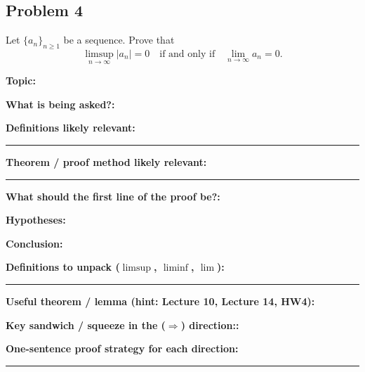 \documentclass[12pt]{article}
\newcommand{\fillfield}[1]{%
  \par\noindent\textbf{#1:}\enspace\hrulefill\par\vspace{3pt}%
}
\newcommand{\fillfieldlong}[1]{%
  \par\noindent\textbf{#1:}\par\vspace{1.5cm}%
  \noindent\rule{\linewidth}{0.35pt}\par\vspace{4pt}%
}
\begin{document}
\newpage
\subsection{Problem 4}

\begin{tcolorbox}[
  enhanced, breakable,
  colback  = probblue,
  colframe = blue!55!black,
  fonttitle = \bfseries,
  title = {\textsc{Problem Statement}\hfill Homework 5, Problem 4}
]
Let $\{a_n\}_{n \geq 1}$ be a sequence.
Prove that
\[
  \limsup_{n \to \infty} |a_n| = 0
  \quad \text{if and only if} \quad
  \lim_{n \to \infty} a_n = 0.
\]
\end{tcolorbox}

\bigskip

\begin{tcolorbox}[
  enhanced, breakable,
  colback  = pass1green,
  colframe = green!55!black,
  fonttitle = \bfseries,
  title = {Pass 1 \enspace\textbf{--}\enspace First Diagnosis}
]
\fillfield{Topic}
\fillfield{What is being asked?}
\fillfieldlong{Definitions likely relevant}
\fillfieldlong{Theorem / proof method likely relevant}
\fillfield{What should the first line of the proof be?}
\end{tcolorbox}

\bigskip

\begin{tcolorbox}[
  enhanced, breakable,
  colback  = pass2yellow,
  colframe = yellow!65!black,
  fonttitle = \bfseries,
  title = {Pass 2 \enspace\textbf{--}\enspace Proof Recipe Card}
]
\fillfield{Hypotheses}
\fillfield{Conclusion}
\fillfieldlong{Definitions to unpack ($\limsup$, $\liminf$, $\lim$)}
\fillfield{Useful theorem / lemma (hint: Lecture 10, Lecture 14, HW4)}
\fillfield{Key sandwich / squeeze in the ($\Rightarrow$) direction:}
\fillfieldlong{One-sentence proof strategy for each direction}
\end{tcolorbox}

\bigskip
\end{document}
